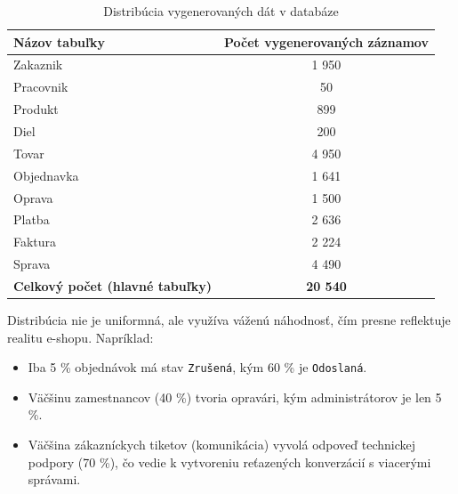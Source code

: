\documentclass[11pt, a4paper]{article}
\begin{document}
\begin{table}[h]
\centering
\renewcommand{\arraystretch}{1.2}
\begin{tabular}{|l|c|}
\hline
\textbf{Názov tabuľky} & \textbf{Počet vygenerovaných záznamov} \\ \hline
Zakaznik & 1 950 \\ \hline
Pracovnik & 50 \\ \hline
Produkt & 899 \\ \hline
Diel & 200 \\ \hline
Tovar & 4 950 \\ \hline
Objednavka & 1 641 \\ \hline
Oprava & 1 500 \\ \hline
Platba & 2 636 \\ \hline
Faktura & 2 224 \\ \hline
Sprava & 4 490 \\ \hline
\textbf{Celkový počet (hlavné tabuľky)} & \textbf{20 540} \\ \hline
\end{tabular}
\caption{Distribúcia vygenerovaných dát v databáze}
\label{tab:seed_data}
\end{table}

Distribúcia nie je uniformná, ale využíva váženú náhodnosť, čím presne reflektuje realitu e-shopu. Napríklad:
\begin{itemize}
    \item Iba 5 \% objednávok má stav \texttt{Zrušená}, kým 60 \% je \texttt{Odoslaná}.
    \item Väčšinu zamestnancov (40 \%) tvoria opravári, kým administrátorov je len 5 \%.
    \item Väčšina zákazníckych tiketov (komunikácia) vyvolá odpoveď technickej podpory (70 \%), čo vedie k vytvoreniu reťazených konverzácií s viacerými správami.
\end{itemize}
\end{document}
